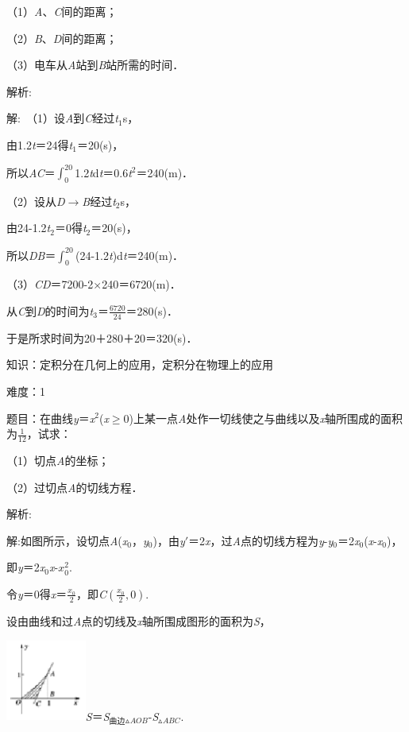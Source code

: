 \documentclass{article} %
\begin{document}
（1）\textit{A}、\textit{C}间的距离；

（2）\textit{B}、\textit{D}间的距离；

（3）电车从\textit{A}站到\textit{B}站所需的时间．

 解析:

 解:　（1）设\textit{A}到\textit{C}经过\textit{t}${}_{1}$s，

由1.2\textit{t}＝24得\textit{t}${}_{1}$＝20(s)，

所以\textit{AC}＝$\int_{0}^{20}$1.2\textit{t}d\textit{t}＝0.6\textit{t}${}^{2}$＝240(m)．

（2）设从\textit{D}$\mathrm{\to}$\textit{B}经过\textit{t}${}_{2}$s，

由24-1.2\textit{t}${}_{2}$＝0得\textit{t}${}_{2}$＝20(s)，

所以\textit{DB}＝$\int_{0}^{20}$(24-1.2\textit{t})d\textit{t}＝240(m)．

（3）\textit{CD}＝7200-2$\mathrm{\times}$240＝6720(m)．

从\textit{C}到\textit{D}的时间为\textit{t}${}_{3}$＝$\frac{6720}{24}$＝280(s)．

于是所求时间为20＋280＋20＝320(s)．



 知识：定积分在几何上的应用，定积分在物理上的应用

 难度：1

 题目：在曲线\textit{y}＝\textit{x}${}^{2}$(\textit{x}$\mathrm{\ge}$0)上某一点\textit{A}处作一切线使之与曲线以及\textit{x}轴所围成的面积为$\frac{1}{12}$，试求：

（1）切点\textit{A}的坐标；

（2）过切点\textit{A}的切线方程．

 解析:　

 解:如图所示，设切点\textit{A}(\textit{x}${}_{0}$，\textit{y}${}_{0}$)，由\textit{y}$\mathrm{\prime}$＝2\textit{x}，过\textit{A}点的切线方程为\textit{y}-\textit{y}${}_{0}$＝2\textit{x}${}_{0}$(\textit{x}-\textit{x}${}_{0}$)，

即\textit{y}＝2\textit{x}${}_{0}$\textit{x}-$x_0^2$.

令\textit{y}＝0得\textit{x}＝$\frac{x_0}{2}$，即\textit{C}$(\frac{x_0}{2},0)$.

设由曲线和过\textit{A}点的切线及\textit{x}轴所围成图形的面积为\textit{S}，

\includegraphics*[width=1.04in, height=1.05in, keepaspectratio=false]{image41}\textit{S}＝\textit{S}${}_{\textrm{曲}\textrm{边}}$${}_{\mathrm{\vartriangle }}$\textit{${}_{AOB}$}-\textit{S}${}_{\mathrm{\vartriangle }}$\textit{${}_{ABC}$}.
\end{document}
